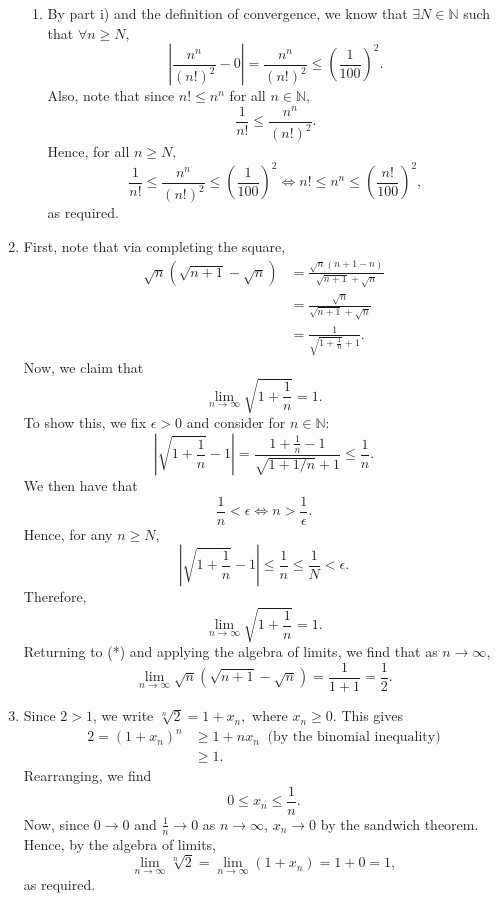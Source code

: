 \documentclass[
  10pt,
  a4paper]{article}
\theoremstyle{plain}
\theoremstyle{definition}
\theoremstyle{plain}
\theoremstyle{plain}
\theoremstyle{plain}
\theoremstyle{plain}
\theoremstyle{definition}
\theoremstyle{definition}
\theoremstyle{remark}
\theoremstyle{remark}
\begin{document}
\begin{enumerate}
\begin{enumerate}
  \item
    By part i) and the definition of convergence, we know that \(\exists N \in \mathbb{N}\) such that \(\forall n \geq N\), \[\left\lvert\frac{n^n}{(n!)^2} - 0 \right\rvert =  \frac{n^n}{(n!)^2} \leq \left(\frac{1}{100}\right)^2.\] Also, note that since \(n! \leq n^n\) for all \(n \in \mathbb{N},\) \[\frac{1}{n!} \leq \frac{n^n}{(n!)^2}.\] Hence, for all \(n \geq N,\) \[\frac{1}{n!} \leq \frac{n^n}{(n!)^2} \leq \left(\frac{1}{100}\right)^2 \Longleftrightarrow n! \leq n^n \leq \left(\frac{n!}{100}\right)^2,\] as required.
  \end{enumerate}
\item
  First, note that via completing the square, \begin{align}\sqrt{n}(\sqrt{n+1} - \sqrt{n}) &= \frac{\sqrt{n}(n+1 - n)}{\sqrt{n+1} + \sqrt{n}}\nonumber\\ &= \frac{\sqrt{n}}{\sqrt{n+1} + \sqrt{n}}\nonumber\\ &= \frac{1}{\sqrt{1 + \frac{1}{n}} + 1}.\tag{*}\end{align} Now, we claim that \[\lim_{n \to \infty} \sqrt{1 + \frac{1}{n}} = 1.\] To show this, we fix \(\epsilon > 0\) and consider for \(n \in \mathbb{N}:\) \[\left\lvert \sqrt{1 + \frac{1}{n}} - 1\right\rvert = \frac{1 + \frac{1}{n}-1}{\sqrt{1 + 1/n}+1} \leq \frac{1}{n}.\] We then have that \[\frac{1}{n} < \epsilon \Longleftrightarrow n > \frac{1}{\epsilon}.\] Hence, for any \(n \geq N,\) \[\left\lvert \sqrt{1 + \frac{1}{n}} - 1\right\rvert \leq \frac{1}{n} \leq \frac{1}{N} < \epsilon.\] Therefore, \[\lim_{n \to \infty} \sqrt{1 + \frac{1}{n}} = 1.\] Returning to (*) and applying the algebra of limits, we find that as \(n \to \infty\), \[\lim_{n \to \infty}\sqrt{n}(\sqrt{n+1} - \sqrt{n}) = \frac{1}{1+1} = \frac{1}{2}.\]
\item
  Since \(2 > 1\), we write \(\sqrt[n]{2} = 1 + x_n,\) where \(x_n \geq 0\). This gives \begin{align*}
  2 = (1 + x_n)^n &\geq 1 + nx_n \;\; \text{(by the binomial inequality)}\\ &\geq 1. \end{align*} Rearranging, we find \[0 \leq x_n \leq \frac{1}{n}.\] Now, since \(0 \to 0\) and \(\frac{1}{n} \to 0\) as \(n \to \infty\), \(x_n \to 0\) by the sandwich theorem. Hence, by the algebra of limits, \[\lim_{n \to \infty} \sqrt[n]{2} = \lim_{n\to\infty}(1 + x_n) = 1 + 0 = 1,\] as required.
\end{enumerate}
\end{document}
